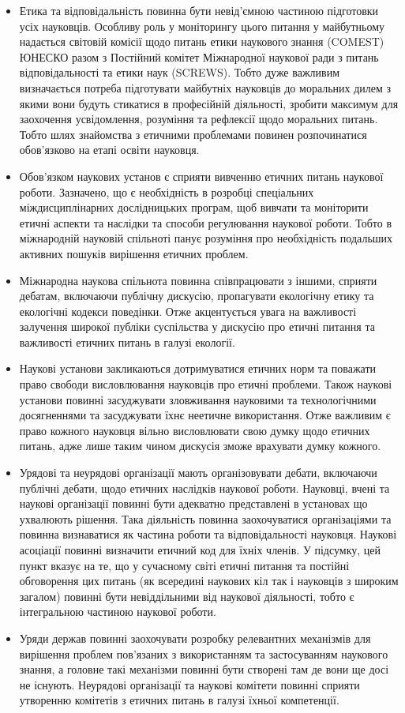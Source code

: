 \begin{itemize}
    \item Етика та відповідальність повинна бути невід'ємною частиною підготовки усіх науковців. Особливу роль у моніторингу цього питання у майбутньому надається світовій комісії щодо питань етики наукового знання (COMEST) ЮНЕСКО разом з Постійний комітет Міжнародної наукової ради з питань відповідальності та етики наук (SCREWS). Тобто дуже важливим визначається потреба підготувати майбутніх науковців до моральних дилем з якими вони будуть стикатися в професійній діяльності, зробити максимум для заохочення усвідомлення, розуміння та рефлексії щодо моральних питань. Тобто шлях знайомства з етичними проблемами повинен розпочинатися обов'язково на етапі освіти науковця.
    \item Обов'язком наукових установ є сприяти вивченню етичних питань наукової роботи. Зазначено, що є необхідність в розробці спеціальних міждисциплінарних дослідницьких програм, щоб вивчати та моніторити етичні аспекти та наслідки та способи регулювання наукової роботи. Тобто в міжнародній науковій спільноті панує розуміння про необхідність подальших активних пошуків вирішення етичних проблем.
    \item Міжнародна наукова спільнота повинна співпрацювати з іншими, сприяти дебатам, включаючи публічну дискусію, пропагувати екологічну етику та екологічні кодекси поведінки. Отже акцентується увага на важливості залучення широкої публіки суспільства у дискусію про етичні питання та важливості етичних питань в галузі екології.
    \item Наукові установи закликаються дотримуватися етичних норм та поважати право свободи висловлювання науковців про етичні проблеми. Також наукові установи повинні засуджувати зловживання науковими та технологічними досягненнями та засуджувати їхнє неетичне використання. Отже важливим є право кожного науковця вільно висловлювати свою думку щодо етичних питань, адже лише таким чином дискусія зможе врахувати думку кожного.
    \item Урядові та неурядові організації мають організовувати дебати, включаючи публічні дебати, щодо етичних наслідків наукової роботи. Науковці, вчені та наукові організації повинні бути адекватно представлені в установах що ухвалюють рішення. Така діяльність повинна заохочуватися організаціями та повинна визнаватися як частина роботи та відповідальності науковця. Наукові асоціації повинні визначити етичний код для їхніх членів. У підсумку, цей пункт вказує на те, що у сучасному світі етичні питання та постійні обговорення цих питань (як всередині наукових кіл так і науковців з широким загалом) повинні бути невіддільними від наукової діяльності, тобто є інтегральною частиною наукової роботи.
    \item Уряди держав повинні заохочувати розробку релевантних механізмів для вирішення проблем пов'язаних з використанням та застосуванням наукового знання, а головне такі механізми повинні бути створені там де вони ще досі не існують. Неурядові організації та наукові комітети повинні сприяти утворенню комітетів з етичних питань в галузі їхньої компетенції.
\end{itemize}

